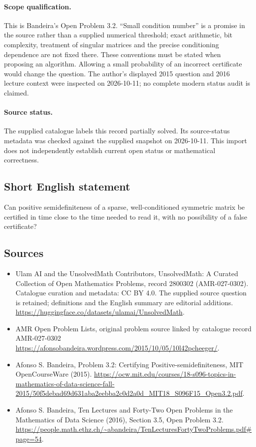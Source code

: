 \documentclass[11pt]{article}
\begin{document}
\paragraph{Scope qualification.}
This is Bandeira's Open Problem 3.2. ``Small condition number'' is a promise in the source rather than a supplied numerical threshold; exact arithmetic, bit complexity, treatment of singular matrices and the precise conditioning dependence are not fixed there. These conventions must be stated when proposing an algorithm. Allowing a small probability of an incorrect certificate would change the question. The author's displayed 2015 question and 2016 lecture context were inspected on 2026-10-11; no complete modern status audit is claimed.
\paragraph{Source status.}
The supplied catalogue labels this record partially solved. Its source-status metadata was checked against the supplied snapshot on 2026-10-11. This import does not independently establish current open status or mathematical correctness.
\subsection{Short English statement}
Can positive semidefiniteness of a sparse, well-conditioned symmetric matrix be certified in time close to the time needed to read it, with no possibility of a false certificate?
\subsection{Sources}
\begin{itemize}
\item[\hypertarget{source:2800302:1}{S1}] Ulam AI and the UnsolvedMath Contributors, UnsolvedMath: A Curated Collection of Open Mathematics Problems, record 2800302 (AMR-027-0302). Catalogue curation and metadata: CC BY 4.0. The supplied source question is retained; definitions and the English summary are editorial additions.
\url{https://huggingface.co/datasets/ulamai/UnsolvedMath}.
\item[\hypertarget{source:2800302:2}{S2}] AMR Open Problem Lists, original problem source linked by catalogue record AMR-027-0302
\url{https://afonsobandeira.wordpress.com/2015/10/05/10l42pcheeger/}.
\item[\hypertarget{source:2800302:3}{S3}] Afonso S. Bandeira, Problem 3.2: Certifying Positive-semidefiniteness, MIT OpenCourseWare (2015).
\url{https://ocw.mit.edu/courses/18-s096-topics-in-mathematics-of-data-science-fall-2015/50f5debad69d631aba2eebba2c0d2a0d_MIT18_S096F15_Open3.2.pdf}.
\item[\hypertarget{source:2800302:4}{S4}] Afonso S. Bandeira, Ten Lectures and Forty-Two Open Problems in the Mathematics of Data Science (2016), Section 3.5, Open Problem 3.2.
\url{https://people.math.ethz.ch/~abandeira/TenLecturesFortyTwoProblems.pdf#page=54}.
\end{itemize}
\end{document}
